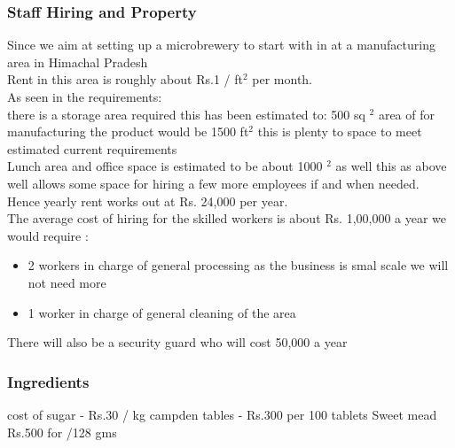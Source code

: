 \documentclass[11pt]{article}
\begin{document}
      \subsubsection{Staff Hiring and Property}
Since we aim at setting up a microbrewery to start with in at a manufacturing area in Himachal Pradesh \\
Rent in this area is roughly about Rs.1 / ft$^2$ per month. \\
As seen in the requirements: \\
there is a storage area required this has been estimated to: 500 sq $^2$ area of for manufacturing the product would be 1500 ft$^2$ this is plenty to space to meet estimated current requirements \\
Lunch area and office space is estimated to be about 1000 $^2$ as well this as above well allows some space for hiring a few more employees if and when needed. \\
Hence yearly rent works out at Rs. 24,000 per year. \\
The average cost of hiring for the skilled workers is about Rs. 1,00,000 a year we would require :
\begin{itemize}
    \subsubsection{Staff Hiring and Property}
Since we aim at setting up a microbrewery to start with in at a manufacturing area in Himachal Pradesh

Rent in this area is roughly about Rs.1 / ft$^2$ per month.
As seen in the requirements:

there is a storage area required this has been estimated to: 500 sq $^2$ area of for manufacturing the product would be 1500 ft$^2$ this is plenty to space to meet estimated current requirements

\item 2 workers in charge of general processing as the business is smal scale we will not need more
\item 1 worker in charge of general cleaning of the area
\end{itemize}

There will also be a security guard who will cost 50,000 a year
   \subsubsection{Ingredients}
cost of sugar -  Rs.30 / kg
campden tables  - Rs.300 per 100 tablets
Sweet mead Rs.500 for /128 gms
\end{document}
